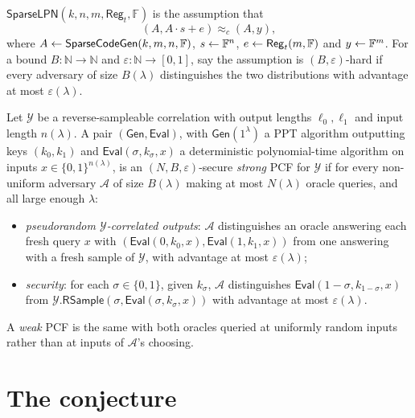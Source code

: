\documentclass{aicr-conjecture}
\newcommand{\Adv}{\mathcal{A}}
\newcommand{\Corr}{\mathcal{Y}}
\newcommand{\F}{\mathbb{F}}
\newcommand{\N}{\mathbb{N}}
\newcommand{\Gen}{\mathsf{Gen}}
\newcommand{\Eval}{\mathsf{Eval}}
\newcommand{\SparseLPN}{\mathsf{SparseLPN}}
\newcommand{\SparseCodeGen}{\mathsf{SparseCodeGen}}
\newcommand{\Reg}{\mathsf{Reg}}
\newcommand{\bits}{\{0,1\}}
\begin{document}
\begin{definition}\label{def:slpn}
$\SparseLPN(k, n, m, \Reg_{t}, \F)$ is the assumption that
\[
  (A, A \cdot s + e) \approx_{c} (A, y),
\]
where $A \sample \SparseCodeGen(k, m, n, \F)$, $s \sample \F^{n}$,
$e \sample \Reg_{t}(m, \F)$ and $y \sample \F^{m}$. For a bound
$B : \N \to \N$ and $\varepsilon : \N \to [0,1]$, say the assumption is
$(B, \varepsilon)$-hard if every adversary of size $B(\lambda)$
distinguishes the two distributions with advantage at most
$\varepsilon(\lambda)$.
\end{definition}

\begin{definition}\label{def:pcf}
Let $\Corr$ be a reverse-sampleable correlation with output lengths
$\ell_{0}, \ell_{1}$ and input length $n(\lambda)$. A pair
$(\Gen, \Eval)$, with $\Gen(1^{\lambda})$ a PPT algorithm outputting
keys $(k_{0}, k_{1})$ and $\Eval(\sigma, k_{\sigma}, x)$ a
deterministic polynomial-time algorithm on inputs
$x \in \bits^{n(\lambda)}$, is an $(N, B, \varepsilon)$-secure
\emph{strong} PCF for $\Corr$ if for every non-uniform adversary $\Adv$
of size $B(\lambda)$ making at most $N(\lambda)$ oracle queries, and all
large enough $\lambda$:
\begin{itemize}[nosep]
  \item \emph{pseudorandom $\Corr$-correlated outputs}: $\Adv$
    distinguishes an oracle answering each fresh query $x$ with
    $(\Eval(0, k_{0}, x), \Eval(1, k_{1}, x))$ from one answering with a
    fresh sample of $\Corr$, with advantage at most
    $\varepsilon(\lambda)$;
  \item \emph{security}: for each $\sigma \in \bits$, given
    $k_{\sigma}$, $\Adv$ distinguishes
    $\Eval(1 - \sigma, k_{1-\sigma}, x)$ from
    $\Corr.\mathsf{RSample}(\sigma, \Eval(\sigma, k_{\sigma}, x))$ with
    advantage at most $\varepsilon(\lambda)$.
\end{itemize}
A \emph{weak} PCF is the same with both oracles queried at uniformly
random inputs rather than at inputs of $\Adv$'s choosing.
\end{definition}

\section{The conjecture}\label{sec:conjectures}
\end{document}
